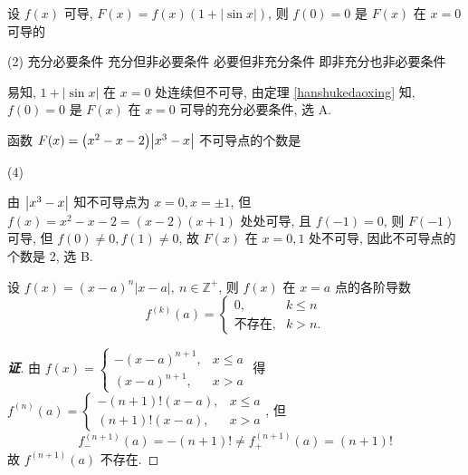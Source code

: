 \begin{example}[1995 数一]
    设 $f(x)$ 可导, $F(x)=f(x)(1+|\sin x|)$, 则 $f(0)=0$ 是 $F(x)$ 在 $x=0$ 可导的
    \begin{tasks}(2)
        \task 充分必要条件
        \task 充分但非必要条件
        \task 必要但非充分条件
        \task 即非充分也非必要条件
    \end{tasks}
\end{example}
\begin{solution}
    易知, $1+|\sin x|$ 在 $x=0$ 处连续但不可导, 由定理 \ref{hanshukedaoxing} 知, $f(0)=0$ 是 $F(x)$ 在 $x=0$ 可导的充分必要条件, 选 A.
\end{solution}

\begin{example}[1998 数二]
    函数 $ F(x)=\qty(x^2-x-2)\qty|x^3-x| $ 不可导点的个数是
    \begin{tasks}(4)
    \end{tasks}
\end{example}
\begin{solution}
    由 $\qty|x^3-x|$ 知不可导点为 $x=0,x=\pm1$, 但 $f(x)=x^2-x-2=(x - 2) (x + 1)$ 处处可导, 且 $f(-1)=0$, 则 $F(-1)$ 可导, 
    但 $f(0)\neq 0,f(1)\neq 0$, 故 $F(x)$ 在 $x=0,1$ 处不可导, 因此不可导点的个数是 2, 选 B.
\end{solution}



\begin{theorem}
    设 $f(x)=(x-a)^{n}|x-a|,~n\in\mathbb{Z}^{+}$, 则 $f(x)$ 在 $x=a$ 点的各阶导数 $$f^{(k)}(a)=\begin{cases}
        0,&k\leqslant n\\\text{不存在},&k>n.
    \end{cases}$$
\end{theorem}
\begin{proof}[{\songti \textbf{证}}]
    由 $f(x)=\begin{cases}
        -(x-a)^{n+1},&x\leqslant a\\(x-a)^{n+1},&x>a
    \end{cases}$ 得 $f^{(n)}(a)=\begin{cases}
        -(n+1)!(x-a),&x\leqslant a\\ (n+1)!(x-a),&x>a
    \end{cases}$, 但 $$f^{(n+1)}_-(a)=-(n+1)!\neq f^{(n+1)}_+(a)=(n+1)!$$ 故 $f^{(n+1)}(a)$ 不存在.
\end{proof}

